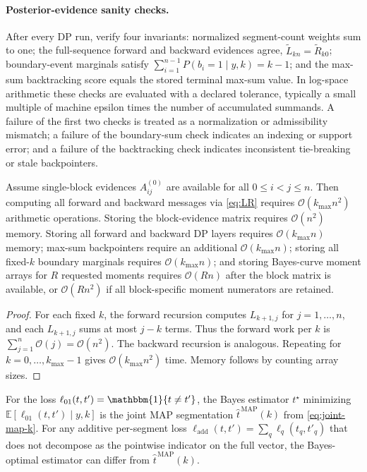 \paragraph{Posterior-evidence sanity checks.}
After every DP run, verify four invariants: normalized segment-count weights
sum to one; the full-sequence forward and backward evidences agree, $\widetilde L_{kn}=\widetilde
R_{k0}$; boundary-event marginals satisfy $\sum_{i=1}^{n-1}P(b_i=1\mid y,k)=k-1$; and the
max-sum backtracking score equals the stored terminal max-sum value. In log-space arithmetic these
checks are evaluated with a declared tolerance, typically a small multiple of machine epsilon times
the number of accumulated summands. A failure of the first two checks is treated as a normalization
or admissibility mismatch; a failure of the boundary-sum check indicates an indexing or support
error; and a failure of the backtracking check indicates inconsistent tie-breaking or stale
backpointers.

\begin{theorem}
\label{thm:dp-complexity}
Assume single-block evidences $A^{(0)}_{ij}$ are available for all $0\le i<j\le n$.
Then computing all forward and backward messages via \eqref{eq:LR} requires
$\mathcal{O}(k_{\max} n^2)$ arithmetic operations. Storing the block-evidence matrix requires
$\mathcal{O}(n^2)$ memory. Storing all forward and backward DP layers requires
$\mathcal{O}(k_{\max} n)$ memory; max-sum backpointers require an additional
$\mathcal{O}(k_{\max} n)$; storing all fixed-$k$ boundary marginals requires
$\mathcal{O}(k_{\max} n)$; and storing Bayes-curve moment arrays for $R$ requested moments requires
$\mathcal{O}(Rn)$ after the block matrix is available, or $\mathcal{O}(Rn^2)$ if all
block-specific moment numerators are retained.
\end{theorem}

\begin{proof}
For each fixed $k$, the forward recursion computes $L_{k+1,j}$ for $j=1,\dots,n$, and each
$L_{k+1,j}$ sums at most $j-k$ terms. Thus the forward work per $k$ is
$\sum_{j=1}^n \mathcal{O}(j)=\mathcal{O}(n^2)$. The backward recursion is analogous. Repeating
for $k=0,\dots,k_{\max}-1$ gives $\mathcal{O}(k_{\max}n^2)$ time. Memory follows by counting
array sizes.
\end{proof}

\begin{corollary}
\label{cor:map-01}
For the loss $\ell_{01}(t,t')=\mathbbm{1}\{t\neq t'\}$, the Bayes estimator $t^\star$ minimizing
$\mathbb{E}[\ell_{01}(t,t')\mid y,k]$ is the joint MAP segmentation
$\widehat{t}^{\,\mathrm{MAP}}(k)$ from \eqref{eq:joint-map-k}. For any additive per-segment loss
$\ell_{\mathrm{add}}(t,t')=\sum_q \ell_q(t_q,t'_q)$ that does not decompose as the pointwise
indicator on the full vector, the Bayes-optimal estimator can differ from
$\widehat{t}^{\,\mathrm{MAP}}(k)$.
\end{corollary}

